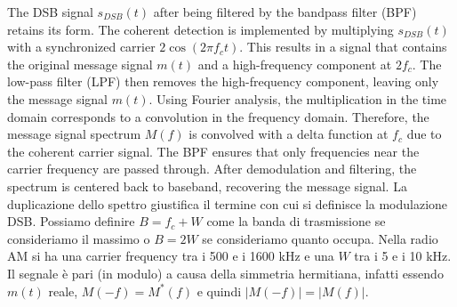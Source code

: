 
The DSB signal \( s_{DSB}(t) \) after being filtered by the bandpass filter (BPF) retains its form. The coherent detection is implemented by multiplying \( s_{DSB}(t) \) with a synchronized carrier \( 2\cos(2\pi f_c t) \). This results in a signal that contains the original message signal \( m(t) \) and a high-frequency component at \( 2f_c \). The low-pass filter (LPF) then removes the high-frequency component, leaving only the message signal \( m(t) \).
Using Fourier analysis, the multiplication in the time domain corresponds to a convolution in the frequency domain. Therefore, the message signal spectrum \( M(f) \) is convolved with a delta function at \( f_c \) due to the coherent carrier signal. The BPF ensures that only frequencies near the carrier frequency are passed through. After demodulation and filtering, the spectrum is centered back to baseband, recovering the message signal.
La duplicazione dello spettro giustifica il termine con cui si definisce la modulazione DSB.
Possiamo definire $B = f_c + W$ come la banda di trasmissione se consideriamo il massimo o $B = 2W$ se consideriamo quanto occupa.
Nella radio AM si ha una carrier frequency tra i 500 e i 1600 kHz e una $W$ tra i 5 e i 10 kHz.
Il segnale è pari (in modulo) a causa della simmetria hermitiana, infatti essendo $m(t)$ reale, $M(-f) = M^*(f)$ e quindi $|M(-f)| = |M(f)|$.


